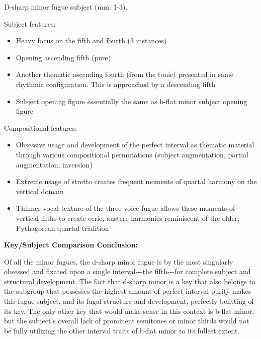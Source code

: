 \begin{Example}[H]
    \begin{center}
    \caption{ D-sharp minor fugue subject (mm. 1-3). }
    \end{center}
\end{Example}
    

    \begin{center}
    \end{center}
    
    Subject features:

\begin{itemize}
\tightlist
\item
  Heavy focus on the fifth and fourth (3 instances)
\item
  Opening ascending fifth (pure)
\item
  Another thematic ascending fourth (from the tonic) presented in same
  rhythmic configuration. This is approached by a descending fifth
\item
  Subject opening figure essentially the same as b-flat minor subject
  opening figure
\end{itemize}

Compositional features:

\begin{itemize}
\tightlist
\item
  Obsessive usage and development of the perfect interval as thematic
  material through various compositional permutations (subject
  augmentation, partial augmentation, inversion)
\item
  Extreme usage of stretto creates frequent moments of quartal harmony
  on the vertical domain
\item
  Thinner vocal texture of the three voice fugue allows these moments of
  vertical fifths to create eerie, austere harmonies reminiscent of the
  older, Pythagorean quartal tradition
\end{itemize}

\textbf{Key/Subject Comparison Conclusion:}

Of all the minor fugues, the d-sharp minor fugue is by the most
singularly obsessed and fixated upon a single interval-\/-\/-the
fifth-\/-\/-for complete subject and structural development. The fact
that d-sharp minor is a key that also belongs to the subgroup that
possesses the highest amount of perfect interval purity makes this fugue
subject, and its fugal structure and development, perfectly befitting of
its key. The only other key that would make sense in this context is
b-flat minor, but the subject's overall lack of prominent semitones or
minor thirds would not be fully utilizing the other interval traits of
b-flat minor to its fullest extent.

